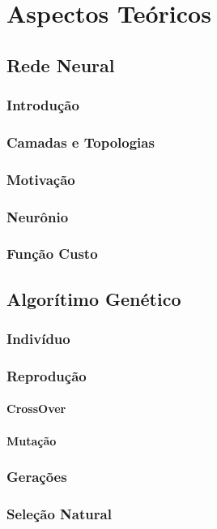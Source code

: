 \chapter{Aspectos Teóricos}\label{ch2}

\section{Rede Neural}

\subsection{Introdução}

\subsection{Camadas e Topologias}

\subsection{Motivação}

\subsection{Neurônio}

\subsection{Função Custo}

\section{Algorítimo Genético}

\subsection{Indivíduo}

\subsection{Reprodução}
\subsubsection{CrossOver}
\subsubsection{Mutação}

\subsection{Gerações}

\subsection{Seleção Natural}
